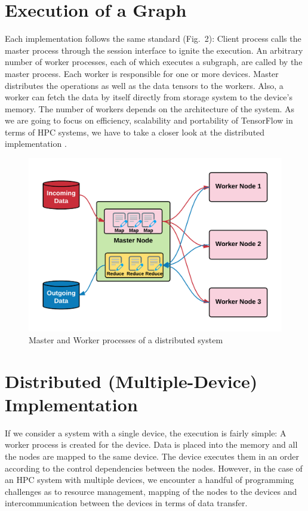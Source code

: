 \documentclass[ieeetran]{article}
\begin{document}
\section{Execution of a Graph} %
\label{sec:execution_of_a_graph}
Each implementation follows the same standard (Fig.\ 2): Client process calls the master process through the session interface to ignite the execution. An arbitrary number of worker processes, each of which executes a subgraph, are called by the master process. Each worker is responsible for one or more devices. Master distributes the operations as well as the data tensors to the workers. Also, a worker can fetch the data by itself directly from storage system to the device's memory. The number of workers depends on the architecture of the system. As we are going to focus on efficiency, scalability and portability of TensorFlow in terms of HPC systems, we have to take a closer look at the distributed implementation \cite{first}.
\begin{figure}[h!]
  \centering
  

\includegraphics[width=0.5\linewidth]{executionofgraph}
 \caption[placeholder]{Master and Worker processes of a distributed system\footnotemark} 
  \label{fig:executionofgraph}
\end{figure}
\addtocounter{footnote}{-2}

\section{Distributed (Multiple-Device) Implementation} %
\label{sec:multiple_device_execution_of_a_graph}
If we consider a system with a single device, the execution is fairly simple: A worker process is created for the device. Data is placed into the memory and all the nodes are mapped to the same device. The device executes them in an order according to the control dependencies between the nodes. However, in the case of an HPC system with multiple devices, we encounter a handful of programming challenges as to resource management, mapping of the nodes to the devices and intercommunication between the devices in terms of data transfer.
\end{document}
